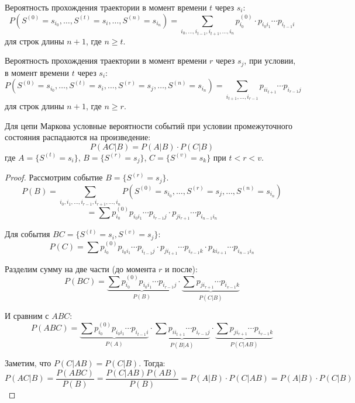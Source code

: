 \begin{statement}
\leavevmode

Вероятность прохождения траектории в момент времени $t$ через $s_i$:
$$ P(S^{(0)} = s_{i_0}, \dots, S^{(t)} = s_{i}, \dots , S^{(n)} = s_{i_n}) = \sum_{i_0, \dots, i_{t-1}, i_{t+1}, \dots, i_n} p_{i_0}^{(0)} \cdot p_{i_0 i_1} \cdots p_{i_{t-1} i}$$
для строк длины $n+1$, где $n \ge t$.
\end{statement}

\begin{statement}
\leavevmode

Вероятность прохождения траектории в момент времени $r$ через $s_j$, при условии, в момент времени $t$ через $s_i$:
$$ P(S^{(0)} = s_{i_0}, \dots, S^{(t)} = s_{i}, \dots, S^{(r)} = s_{j}, \dots , S^{(n)} = s_{i_n}) = \sum_{i_{t+1}, \dots, i_{r-1}} p_{i i_{t+1}} \cdots p_{i_{r-1} j}$$
для строк длины $n+1$, где $n \ge r$.
\end{statement}

\begin{theorem}
Для цепи Маркова условные вероятности событий при условии промежуточного состояния распадаются на произведение:
$$ P(AC|B) = P(A|B) \cdot P(C|B) $$
где $A = \{S^{(t)} = s_i\}$, $B = \{S^{(r)} = s_j\}$, $C = \{S^{(v)} = s_k\}$ при $t < r < v$.
\end{theorem}

\begin{proof}
\leavevmode

Рассмотрим событие $B = \{S^{(r)} = s_j\}$.
$$ P(B) = \sum_{i_0, i_1, \dots, i_{r-1}, i_{r+1}, \dots, i_n} P(S^{(0)} = s_{i_0}, \dots, S^{(r)} = s_j, \dots, S^{(n)} = s_{i_n}) $$
$$ = \sum p_{i_0}^{(0)} p_{i_0 i_1} \cdots p_{i_{r-1} j} \cdot p_{j i_{r+1}} \cdots p_{i_{n-1} i_n} $$

Для события $BC = \{S^{(t)} = s_i, S^{(v)} = s_j\}$:
$$ P(C) = \sum p_{i_0}^{(0)} p_{i_0 i_1} \cdots p_{i_{t-1} j} \cdot p_{j i_{t+1}} \cdots p_{i_{v-1} k} \cdot p_{k i_{v+1}} \cdots p_{i_{n-1} i_n} $$

Разделим сумму на две части (до момента $r$ и после):
$$ P(BC) = \underbrace{\sum p_{i_0}^{(0)} p_{i_0 i_1} \cdots p_{i_{r-1} j}}_{P(B)} \cdot \underbrace{\sum p_{j i_{r+1}} \cdots p_{i_{v-1} k}}_{P(C|B)} $$

И сравним с $ABC$:
$$ P(ABC) = \underbrace{\sum p_{i_0}^{(0)} p_{i_0 i_1} \cdots p_{i_{t-1} i}}_{P(A)} \cdot \underbrace{\sum p_{i i_{t+1}} \cdots p_{i_{r-1} j}}_{P(B|A)} \cdot \underbrace{\sum p_{j i_{r+1}} \cdots p_{i_{v-1} k}}_{P(C|AB)} $$

Заметим, что $P(C|AB) = P(C|B)$. Тогда:
$$ P(AC|B) = \frac{P(ABC)}{P(B)} = \frac{P(C|AB)P(AB)}{P(B)} = P(A|B) \cdot P(C|AB) = P(A|B) \cdot P(C|B) $$
\end{proof}


